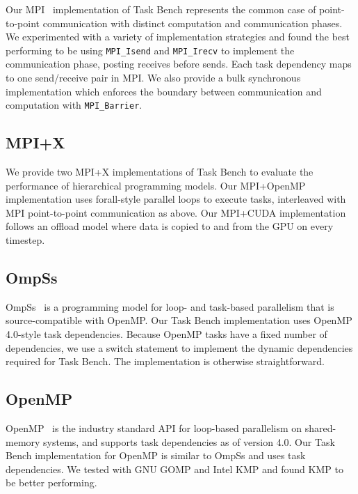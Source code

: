 Our MPI~\cite{MPI} implementation of Task Bench represents the common
case of point-to-point communication with distinct computation and
communication phases. We experimented with a variety of implementation
strategies and found the best performing to be using
\lstinline[language=C++]{MPI_Isend} and
\lstinline[language=C++]{MPI_Irecv} to implement the communication
phase, posting receives before sends. Each task dependency maps to one
send/receive pair in MPI. We also provide a bulk synchronous
implementation which enforces the boundary between communication and
computation with \lstinline[language=C++]{MPI_Barrier}.

\subsection{MPI+X}

We provide two MPI+X implementations of Task Bench to evaluate the
performance of hierarchical programming models. Our MPI+OpenMP
implementation uses forall-style parallel loops to execute tasks,
interleaved with MPI point-to-point communication as above. Our
MPI+CUDA implementation follows an offload model where data is copied
to and from the GPU on every timestep.

\subsection{OmpSs}

OmpSs~\cite{OmpSs11} is a programming model for loop- and task-based parallelism
that is source-compatible with OpenMP. Our Task Bench implementation
uses OpenMP 4.0-style task dependencies. Because OpenMP tasks have a fixed number of dependencies, we use a switch
statement to implement the dynamic dependencies required for Task
Bench. The implementation is otherwise straightforward.


\subsection{OpenMP}

OpenMP~\cite{OpenMPSpec40} is the industry standard API for loop-based
parallelism on shared-memory systems, and supports task dependencies as of version 4.0. Our Task Bench implementation
for OpenMP is similar to OmpSs and uses
task dependencies. We tested with GNU GOMP and Intel KMP
and found KMP to be better performing.

